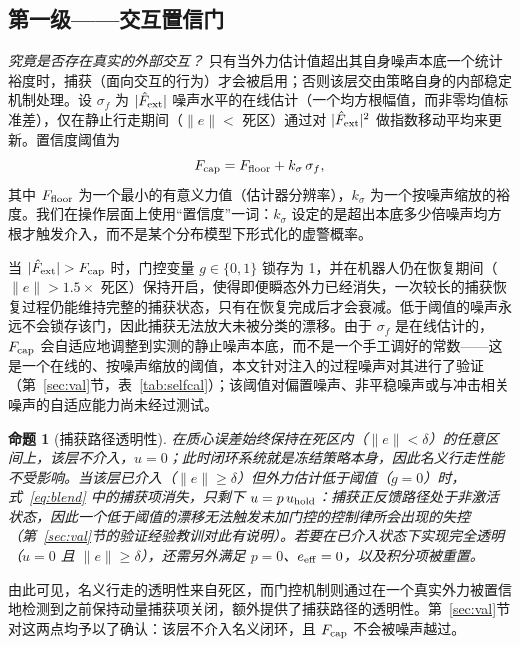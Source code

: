 \documentclass[journal]{IEEEtran}
\newtheorem{proposition}{命题}
\begin{document}
\subsection{第一级——交互置信门}
\label{sec:gate}

\emph{究竟是否存在真实的外部交互？} 只有当外力估计值超出其自身噪声本底一个统计裕度时，捕获（面向交互的行为）才会被启用；否则该层交由策略自身的内部稳定机制处理。设 $\sigma_f$ 为 $|\hat F_{\rm ext}|$ 噪声水平的在线估计（一个均方根幅值，而非零均值标准差），仅在静止行走期间（$\|e\|<$ 死区）通过对 $|\hat F_{\rm ext}|^2$ 做指数移动平均来更新。置信度阈值为
\begin{equation}
F_{\rm cap}=F_{\rm floor}+k_\sigma\,\sigma_f,
\label{eq:fcap}
\end{equation}
其中 $F_{\rm floor}$ 为一个最小的有意义力值（估计器分辨率），$k_\sigma$ 为一个按噪声缩放的裕度。我们在操作层面上使用“置信度”一词：$k_\sigma$ 设定的是超出本底多少倍噪声均方根才触发介入，而不是某个分布模型下形式化的虚警概率。

当 $|\hat F_{\rm ext}|>F_{\rm cap}$ 时，门控变量 $g\in\{0,1\}$ 锁存为 1，并在机器人仍在恢复期间（$\|e\|>1.5\times$ 死区）保持开启，使得即便瞬态外力已经消失，一次较长的捕获恢复过程仍能维持完整的捕获状态，只有在恢复完成后才会衰减。低于阈值的噪声永远不会锁存该门，因此捕获无法放大未被分类的漂移。由于 $\sigma_f$ 是在线估计的，$F_{\rm cap}$ 会自适应地调整到实测的静止噪声本底，而不是一个手工调好的常数——这是一个在线的、按噪声缩放的阈值，本文针对注入的过程噪声对其进行了验证（第~\ref{sec:val}节，表~\ref{tab:selfcal}）；该阈值对偏置噪声、非平稳噪声或与冲击相关噪声的自适应能力尚未经过测试。

\begin{proposition}[捕获路径透明性]
\label{prop:gate}
在质心误差始终保持在死区内（$\|e\|<\delta$）的任意区间上，该层不介入，$u=0$；此时闭环系统就是冻结策略本身，因此名义行走性能不受影响。当该层已介入（$\|e\|\ge\delta$）但外力估计低于阈值（$g=0$）时，式~\eqref{eq:blend} 中的捕获项消失，只剩下 $u=p\,u_{\rm hold}$：捕获正反馈路径处于非激活状态，因此一个低于阈值的漂移无法触发未加门控的控制律所会出现的失控（第~\ref{sec:val}节的验证经验教训对此有说明）。若要在已介入状态下实现完全透明（$u=0$ 且 $\|e\|\ge\delta$），还需另外满足 $p=0$、$e_{\rm eff}=0$，以及积分项被重置。
\end{proposition}

由此可见，名义行走的透明性来自死区，而门控机制则通过在一个真实外力被置信地检测到之前保持动量捕获项关闭，额外提供了捕获路径的透明性。第~\ref{sec:val}节对这两点均予以了确认：该层不介入名义闭环，且 $F_{\rm cap}$ 不会被噪声越过。
\end{document}
